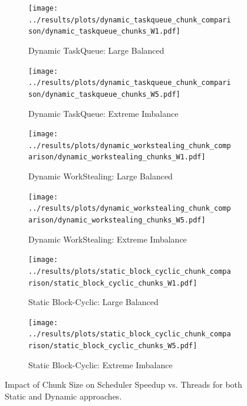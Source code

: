 \documentclass[10pt]{article}
\begin{document}
\begin{figure}[H]
    \centering
    \begin{subfigure}[b]{0.49\textwidth}
        \centering
        \texttt{[image: ../results/plots/dynamic\_taskqueue\_chunk\_comparison/dynamic\_taskqueue\_chunks\_W1.pdf]}
        \caption{Dynamic TaskQueue: Large Balanced}
        \label{fig:chunk_impact_dynamic_balanced_TQ}
    \end{subfigure}
    \hfill
    \begin{subfigure}[b]{0.49\textwidth}
        \centering
        \texttt{[image: ../results/plots/dynamic\_taskqueue\_chunk\_comparison/dynamic\_taskqueue\_chunks\_W5.pdf]}
        \caption{Dynamic TaskQueue: Extreme Imbalance}
        \label{fig:chunk_impact_dynamic_imbalance_TQ}
    \end{subfigure}

    \vspace{0.5em}

    \begin{subfigure}[b]{0.49\textwidth}
        \centering
        \texttt{[image: ../results/plots/dynamic\_workstealing\_chunk\_comparison/dynamic\_workstealing\_chunks\_W1.pdf]}
        \caption{Dynamic WorkStealing: Large Balanced}
        \label{fig:chunk_impact_dynamic_balanced_WS}
    \end{subfigure}
    \hfill
    \begin{subfigure}[b]{0.49\textwidth}
        \centering
        \texttt{[image: ../results/plots/dynamic\_workstealing\_chunk\_comparison/dynamic\_workstealing\_chunks\_W5.pdf]}
        \caption{Dynamic WorkStealing: Extreme Imbalance}
        \label{fig:chunk_impact_dynamic_imbalance_WS}
    \end{subfigure}

    \vspace{0.5em}

    \begin{subfigure}[b]{0.49\textwidth}
        \centering
        \texttt{[image: ../results/plots/static\_block\_cyclic\_chunk\_comparison/static\_block\_cyclic\_chunks\_W1.pdf]}
        \caption{Static Block-Cyclic: Large Balanced}
        \label{fig:chunk_impact_sbc_balanced}
    \end{subfigure}
    \hfill
    \begin{subfigure}[b]{0.49\textwidth}
        \centering
        \texttt{[image: ../results/plots/static\_block\_cyclic\_chunk\_comparison/static\_block\_cyclic\_chunks\_W5.pdf]}
        \caption{Static Block-Cyclic: Extreme Imbalance}
        \label{fig:chunk_impact_sbc_imbalance}
    \end{subfigure}

    \caption{Impact of Chunk Size on Scheduler Speedup vs. Threads for both Static and Dynamic approaches.}
    \label{fig:chunk_impact_combined}
\end{figure}
\end{document}
